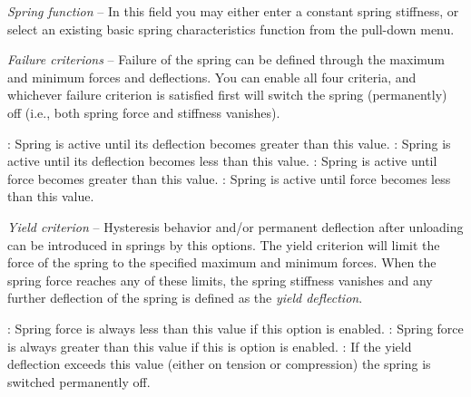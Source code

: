 \begin{bulletlist}
\item{\sl Spring function} --
  In this field you may either enter a constant spring stiffness,
  or select an existing basic spring characteristics function from the
  pull-down menu.

\item{\sl Failure criterions} --
  Failure of the spring can be defined through the maximum and minimum forces
  and deflections. You can enable all four criteria, and whichever failure
  criterion is satisfied first will switch the spring (permanently) off
  (i.e., both spring force and stiffness vanishes).
  \begin{itemize}
   :
    Spring is active until its deflection becomes greater than this value.
   :
    Spring is active until its deflection becomes less than this value.
   :
    Spring is active until force becomes greater than this value.
   :
    Spring is active until force becomes less than this value.
  \end{itemize}

\item{\sl Yield criterion} --
  Hysteresis behavior and/or permanent deflection after unloading can be
  introduced in springs by this options. The yield criterion will limit the
  force of the spring to the specified maximum and minimum forces.
  When the spring force reaches any of these limits, the spring stiffness
  vanishes and any further deflection of the spring is defined as the
  {\sl yield deflection}.
  \begin{itemize}
   :
    Spring force is always less than this value if this option is enabled.
   :
    Spring force is always greater than this value if this is option is enabled.
   :
    If the yield deflection exceeds this value (either on tension or
    compression) the spring is switched permanently off.
  \end{itemize}
\end{bulletlist}


